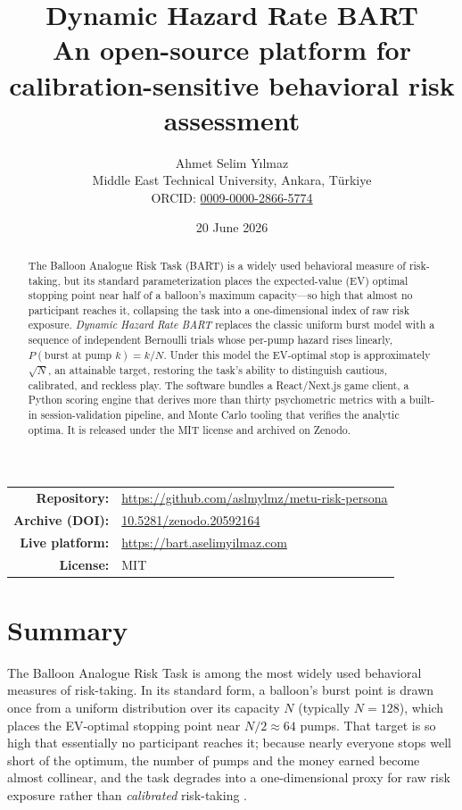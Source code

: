 \documentclass[11pt]{article}
\title{\textbf{Dynamic Hazard Rate BART}\\[2pt]
\large An open-source platform for calibration-sensitive behavioral risk assessment}
\author{Ahmet Selim Y\i lmaz\\[2pt]
  \small Middle East Technical University, Ankara, T\"urkiye\\
  \small ORCID: \href{https://orcid.org/0009-0000-2866-5774}{0009-0000-2866-5774}}
\date{20 June 2026}
\begin{document}
\maketitle

\begin{center}
\small
\begin{tabular}{rl}
\textbf{Repository:} & \url{https://github.com/aslmylmz/metu-risk-persona}\\
\textbf{Archive (DOI):} & \href{https://doi.org/10.5281/zenodo.20592164}{10.5281/zenodo.20592164}\\
\textbf{Live platform:} & \url{https://bart.aselimyilmaz.com}\\
\textbf{License:} & MIT\\
\end{tabular}
\end{center}

\begin{abstract}
\noindent The Balloon Analogue Risk Task (BART) is a widely used behavioral
measure of risk-taking, but its standard parameterization places the
expected-value (EV) optimal stopping point near half of a balloon's maximum
capacity---so high that almost no participant reaches it, collapsing the task into
a one-dimensional index of raw risk exposure. \emph{Dynamic Hazard Rate BART}
replaces the classic uniform burst model with a sequence of independent Bernoulli
trials whose per-pump hazard rises linearly, $P(\text{burst at pump }k)=k/N$.
Under this model the EV-optimal stop is approximately $\sqrt{N}$, an attainable
target, restoring the task's ability to distinguish cautious, calibrated, and
reckless play. The software bundles a React/Next.js game client, a Python scoring
engine that derives more than thirty psychometric metrics with a built-in
session-validation pipeline, and Monte Carlo tooling that verifies the analytic
optima. It is released under the MIT license and archived on Zenodo.
\end{abstract}

\section{Summary}

The Balloon Analogue Risk Task \citep{lejuez2002} is among the most widely used
behavioral measures of risk-taking. In its standard form, a balloon's burst point
is drawn once from a uniform distribution over its capacity $N$ (typically
$N=128$), which places the EV-optimal stopping point near $N/2 \approx 64$ pumps.
That target is so high that essentially no participant reaches it; because nearly
everyone stops well short of the optimum, the number of pumps and the money
earned become almost collinear, and the task degrades into a one-dimensional
proxy for raw risk exposure rather than \emph{calibrated} risk-taking
\citep{frey2017}.
\end{document}
